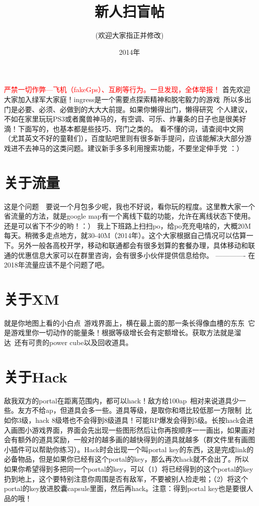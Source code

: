 \documentclass[12pt]{article}
\theoremstyle{definition}
\theoremstyle{remark}
\numberwithin{equation}{section}
\begin{document}
\title{新人扫盲帖}
\author{(欢迎大家指正并修改)}
\date{2014年}

\maketitle
\huge\textcolor{red}{严禁一切作弊---飞机（fakeGps）、互刷等行为。一旦发现，全体举报！}
\normalsize
\newpage
首先欢迎大家加入绿军大家庭！ingress是一个需要点探索精神和脱宅毅力的游戏~所以多出门是必要、必须、必做到的大大大前提。如果你懒得出门，懒得研究~个人建议，不如在家里玩玩PS3或者魔兽神马的，有空调、可乐、炸薯条的日子也是很美好滴！下面写的，也基本都是些技巧、窍门之类的。 看不懂的词，请查阅中文网（尤其英文不好的童鞋们），百度贴吧里则有很多新手提问，应该能解决大部分游戏进不去神马的这类问题。建议新手多多利用搜索功能，不要坐定伸手党 ：）

\section{关于流量}
这是个问题~~要说一个月包多少呢，我也不好说，看你玩的程度。这里教大家一个省流量的方法，就是google map有一个离线下载的功能，允许在离线状态下使用。还是可以省下不少的哟！：） 我上下班路上扫扫po，给po充充电啥的，大概20M每天。稍微多走点地方，就30-40M（2014年）。这个大家根据自己情况可以估算一下。另外一般各高校开学，移动和联通都会有很多划算的套餐办理，具体移动和联通的优惠信息大家可以在群里咨询，会有很多小伙伴提供信息给你。
-------------
在2018年流量应该不是个问题了吧。
\section{关于XM}
就是你地图上看的小白点~游戏界面上，横在最上面的那一条长得像血槽的东东~它是游戏里你一切动作的能量条！根据等级增长会有定额增长。获取方法就是溜达~还有可贵的power cube以及回收道具。

\section{关于Hack}
敌我双方的portal在距离范围内，都可以hack！敌方给100ap~相对来说道具少一些。友方不给ap，但道具会多一些。道具等级，是取你和塔比较低那一方限制~比如你3级，hack 8级塔也不会得到8级道具！可能RP爆发会得到5级。长按hack会进入画图小游戏界面，界面会先出现一些图形然后让你再按顺序一一画出，如果画对会有额外的道具奖励，一般对的越多画的越快得到的道具就越多（群文件里有画图小插件可以帮助你练习）。Hack时会出现一个叫portal key的东西，这是完成link的必备物品，但是如果你已经有这个portal的key，那么再次hack就不会出了。所以如果你希望得到多把同一个portal的key，可以（1）将已经得到的这个portal的key扔到地上，这个要特别注意你周围是否有敌军，不要被别人捡走啦；（2）将这个portal的key放进胶囊capsule里面，然后再hack。注意：得到portal key也是要很人品的哦！
\end{document}
